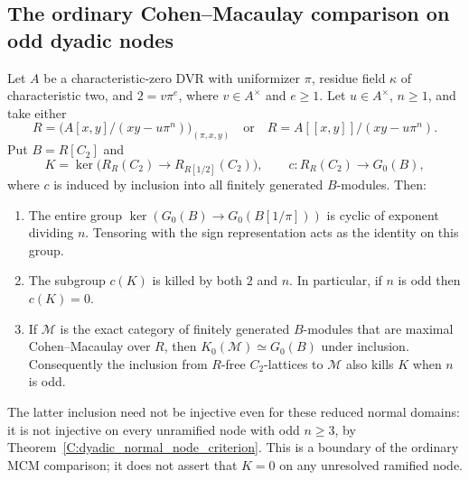 \subsection{The ordinary Cohen--Macaulay comparison on odd dyadic nodes}

\begin{proposition}
\label{C:odd-node-MCM-comparison-boundary}
Let $A$ be a characteristic-zero DVR with uniformizer $\pi$,
residue field $\kappa$ of characteristic two, and
$2=v\pi^e$, where $v\in A^\times$ and $e\geq1$.
Let $u\in A^\times$, $n\geq1$, and take either
\[
 R=\bigl(A[x,y]/(xy-u\pi^n)\bigr)_{(\pi,x,y)}
 \quad\text{or}\quad R=A[[x,y]]/(xy-u\pi^n).
\]
Put $B=R[C_2]$ and
\[
 K=\ker\bigl(R_R(C_2)\longrightarrow R_{R[1/2]}(C_2)\bigr),
 \qquad c:R_R(C_2)\longrightarrow G_0(B),             \tag{C.1.MB1}
\]
where $c$ is induced by inclusion into all finitely generated
$B$-modules.  Then:
\begin{enumerate}
\item The entire group
$\ker(G_0(B)\to G_0(B[1/\pi]))$ is cyclic of exponent
dividing $n$.  Tensoring with the sign representation acts
as the identity on this group.
\item The subgroup $c(K)$ is killed by both $2$ and $n$.
In particular, if $n$ is odd then $c(K)=0$.
\item If $\mathcal M$ is the exact category of finitely
generated $B$-modules that are maximal Cohen--Macaulay
over $R$, then $K_0(\mathcal M)\simeq G_0(B)$ under
inclusion.  Consequently the inclusion from $R$-free
$C_2$-lattices to $\mathcal M$ also kills $K$ when $n$
is odd.
\end{enumerate}
The latter inclusion need not be injective even for these
reduced normal domains: it is not injective on every
unramified node with odd $n\geq3$, by
Theorem~\ref{C:dyadic_normal_node_criterion}.
This is a boundary of the ordinary MCM comparison;
it does not assert that $K=0$ on any unresolved ramified node.
\end{proposition}
